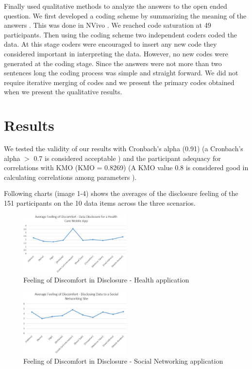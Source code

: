 \documentclass[conference]{IEEEtran}
\begin{document}
Finally used qualitative methods to analyze the answers to the open ended question. We first developed a coding scheme by summarizing the meaning of the answers  \cite {wong2017eliciting}. This was done in NVivo \cite {saldana2015coding}. We reached code saturation at 49 participants. Then using the coding scheme two independent coders coded the data. At this stage coders were encouraged to insert any new code they considered important in interpreting the data. However, no new codes were generated at the coding stage. Since the answers were not more than two sentences long the coding process was simple and straight forward. We did not require iterative merging of codes and we present the primary codes obtained when we present the qualitative results.

\section {Results}

We tested the validity of our results with Cronbach's alpha (0.91) (a Cronbach's alpha $>$ 0.7 is considered acceptable \cite {nunnally1967psychometric}) and the participant adequacy for correlations with KMO (KMO =  0.8269) (A KMO value $0.8$ is considered good in calculating correlations among parameters \cite {kim1978factor}). 









Following charts (image 1-4) shows the averages of the disclosure feeling of the 151 participants on the 10 data items across the three scenarios.

\begin{figure}[h]
\begin{center}
\includegraphics[width=0.5\textwidth]{Average_Health}
\caption{Feeling of Discomfort in Disclosure - Health  application}
\end{center}
\end{figure}

\begin{figure}[h]
\begin{center}
\includegraphics[width=0.5\textwidth]{Average_SocialNetworking}
\caption{Feeling of Discomfort in Disclosure - Social Networking application}
\end{center}
\end{figure}
\end{document}

